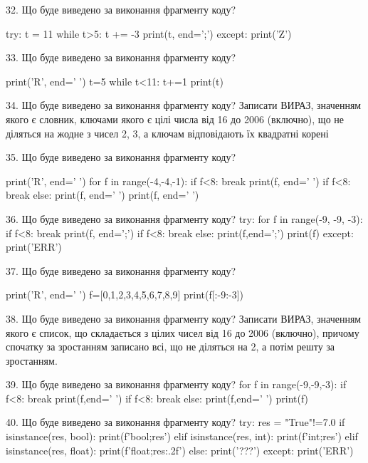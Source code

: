 \documentclass[11pt]{article}
\begin{document}

32. Що буде виведено за виконання фрагменту коду?

try:
    t = 11
    while t>5:
        t += -3
    print(t, end=';')
except:
    print('Z')



33. Що буде виведено за виконання фрагменту коду?

print('R', end=' ')
t=5
while t<11:
    t+=1
print(t)



34. Що буде виведено за виконання фрагменту коду?
Записати ВИРАЗ, значенням якого є словник, ключами якого є цілі числа від 16 до 2006 (включно), що не діляться на жодне з чисел 2, 3, а ключам відповідають їх квадратні корені 


35. Що буде виведено за виконання фрагменту коду?

print('R', end=' ')
for f in range(-4,-4,-1):
    if f<8:
        break
        print(f, end=' ')
    if f<8:
        break
    else:
        print(f, end=' ')
    print(f, end=' ')


36. Що буде виведено за виконання фрагменту коду?
try:
    for f in range(-9, -9, -3):
        if f<8:
            break
        print(f, end=';')
        if f<8:
            break
    else:
        print(f,end=';')
    print(f)
except:
    print('ERR')


37. Що буде виведено за виконання фрагменту коду?

print('R', end=' ')
f=[0,1,2,3,4,5,6,7,8,9]
print(f[:-9:-3])



38. Що буде виведено за виконання фрагменту коду?
Записати ВИРАЗ, значенням якого є список, що складається з цілих чисел від 16 до 2006 (включно), причому спочатку за зростанням записано всі, що не діляться на 2, а потім решту за зростанням.

39. Що буде виведено за виконання фрагменту коду?
for f in range(-9,-9,-3):
    if f<8:
        break
        print(f,end=' ')
    if f<8:
        break
    else:
        print(f,end=' ')
    print(f)


40. Що буде виведено за виконання фрагменту коду?
try:
    res = "True"!=7.0
    if isinstance(res, bool):
        print(f'bool;{res}')
    elif isinstance(res, int):
        print(f'int;{res}')
    elif isinstance(res, float):
        print(f'float;{res:.2f}')
    else:
        print('???')
except:
    print('ERR')
\end{document}
